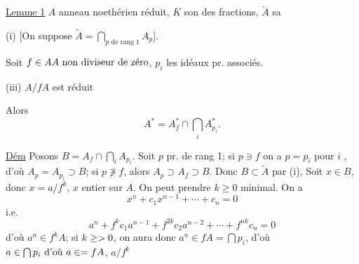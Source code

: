 \uline{Lemme 1} $A$ anneau noethérien  réduit, $K$ son   des fractions, $\widetilde A$ sa  

(i) [On suppose $\widetilde A=\displaystyle\bigcap_{p\text{ de rang }1}A_p$]. 

Soit $f\in AA\text{ non diviseur de zéro}$, $p_i$ les idéaux pr. associés.


(iii) $A/fA$ est réduit


Alors
\[
\boxed{A^*=A_f^*\cap\bigcap_i A_{p_i}^*.}
\]

\uline{Dém} Posons $B=A_f\cap\displaystyle\bigcap_i A_{p_i}$. Soit $p$ pr. de rang 1; si $p\ni f$ on a $p=p_i$ pour $i$ , d'où $A_p=A_{p_i}\supset B$; si $p\not\ni f$, alors $A_p\supset A_f\supset B$. Donc $B\subset\widetilde A$ par (i),  Soit $x\in B$, donc $x=a/f^k$, $x$ entier sur $A$. On peut prendre $k\geq 0$ minimal.  On a
\[
x^n+c_1x^{n-1}+\cdots+c_n=0
\]
i.e.
\[
a^n+f^k c_1a^{n-1}+f^{2k}c_2a^{n-2}+\cdots+f^{nk}c_n=0
\]
d'où $a^n\in f^k A$; si $k\geq >0$, on aura donc $a^n\in fA=\bigcap p_i$, d'où $a\in\bigcap p_i\text{ d'où }a\in= fA$,    $a/f^k$
